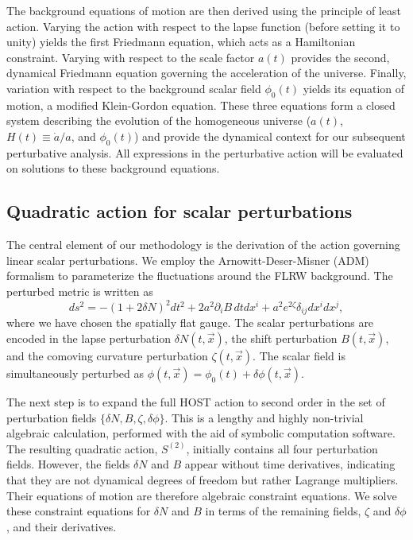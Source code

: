 \documentclass[twocolumn]{aastex631}
\begin{document}
The background equations of motion are then derived using the principle of least action. Varying the action with respect to the lapse function (before setting it to unity) yields the first Friedmann equation, which acts as a Hamiltonian constraint. Varying with respect to the scale factor $a(t)$ provides the second, dynamical Friedmann equation governing the acceleration of the universe. Finally, variation with respect to the background scalar field $\phi_0(t)$ yields its equation of motion, a modified Klein-Gordon equation. These three equations form a closed system describing the evolution of the homogeneous universe ($a(t)$, $H(t) \equiv \dot{a}/a$, and $\phi_0(t)$) and provide the dynamical context for our subsequent perturbative analysis. All expressions in the perturbative action will be evaluated on solutions to these background equations.

\subsection{Quadratic action for scalar perturbations}
The central element of our methodology is the derivation of the action governing linear scalar perturbations. We employ the Arnowitt-Deser-Misner (ADM) formalism to parameterize the fluctuations around the FLRW background. The perturbed metric is written as
\begin{equation}
ds^2 = -(1+2\delta N)^2 dt^2 + 2 a^2 \partial_i B \, dt dx^i + a^2 e^{2\zeta} \delta_{ij} dx^i dx^j,
\end{equation}
where we have chosen the spatially flat gauge. The scalar perturbations are encoded in the lapse perturbation $\delta N(t, \vec{x})$, the shift perturbation $B(t, \vec{x})$, and the comoving curvature perturbation $\zeta(t, \vec{x})$. The scalar field is simultaneously perturbed as $\phi(t, \vec{x}) = \phi_0(t) + \delta\phi(t, \vec{x})$.

The next step is to expand the full HOST action to second order in the set of perturbation fields $\{\delta N, B, \zeta, \delta\phi\}$. This is a lengthy and highly non-trivial algebraic calculation, performed with the aid of symbolic computation software. The resulting quadratic action, $S^{(2)}$, initially contains all four perturbation fields. However, the fields $\delta N$ and $B$ appear without time derivatives, indicating that they are not dynamical degrees of freedom but rather Lagrange multipliers. Their equations of motion are therefore algebraic constraint equations. We solve these constraint equations for $\delta N$ and $B$ in terms of the remaining fields, $\zeta$ and $\delta\phi$, and their derivatives.
\end{document}
